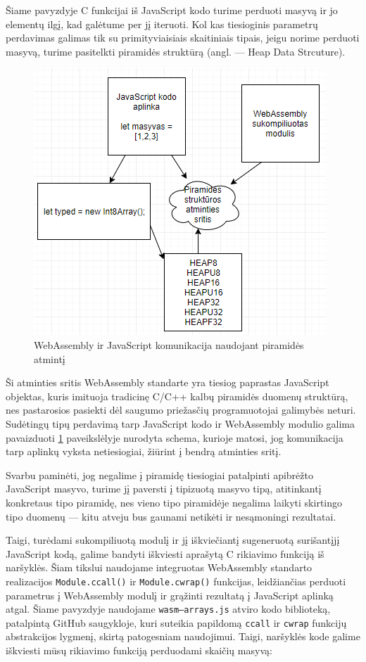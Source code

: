 \documentclass{VUMIFPSkursinis}
\begin{document}
Šiame pavyzdyje C funkcijai iš JavaScript kodo turime perduoti masyvą ir jo elementų ilgį, kad galėtume per jį iteruoti. Kol kas tiesioginis parametrų perdavimas galimas tik su primityviaisiais skaitiniais tipais, jeigu norime perduoti masyvą, turime pasitelkti piramidės struktūrą (angl. — Heap Data Strcuture). 
\begin{figure}[h!]
  \begin{center}
  \includegraphics[scale=1]{wasm_heap.png}
  \end{center}
  \caption{WebAssembly ir JavaScript komunikacija naudojant piramidės atmintį}
  \label{fig:wasm_stack}
\end{figure}
Ši atminties sritis WebAssembly standarte yra tiesiog paprastas JavaScript objektas, kuris imituoja tradicinę C/C++ kalbų piramidės duomenų struktūrą, nes pastarosios pasiekti dėl saugumo priežasčių programuotojai galimybės neturi. 
Sudėtingų tipų perdavimą tarp JavaScript kodo ir WebAssembly modulio galima pavaizduoti \ref{fig:wasm_stack} paveikslėlyje nurodyta schema, kurioje matosi, jog komunikacija tarp aplinkų vyksta netiesiogiai, žiūrint į bendrą atminties sritį.

Svarbu paminėti, jog negalime į piramidę tiesiogiai patalpinti apibrėžto JavaScript masyvo, turime jį paversti į tipizuotą masyvo tipą, atitinkantį konkretaus tipo piramidę, nes vieno tipo piramidėje negalima laikyti skirtingo tipo duomenų — kitu atveju bus gaunami netikėti ir nesąmoningi rezultatai. 

Taigi, turėdami sukompiliuotą modulį ir jį iškviečiantį sugeneruotą surišantįjį JavaScript kodą, galime bandyti iškviesti aprašytą C rikiavimo funkciją iš naršyklės. Šiam tikslui naudojame integruotas WebAssembly standarto realizacijos \verb|Module.ccall()| ir \verb|Module.cwrap()| funkcijas, leidžiančias perduoti parametrus į WebAssembly modulį ir grąžinti rezultatą į JavaScript aplinką atgal. Šiame pavyzdyje naudojame \verb|wasm—arrays.js| atviro kodo biblioteką, patalpintą GitHub saugykloje, kuri suteikia papildomą \verb|ccall| ir \verb|cwrap| funkcijų abstrakcijos lygmenį, skirtą patogesniam naudojimui. \cite{WAA19} Taigi, naršyklės kode galime iškviesti mūsų rikiavimo funkciją perduodami skaičių masyvą:
\end{document}
